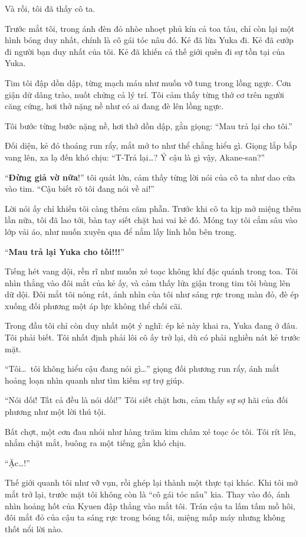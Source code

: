 \documentclass[../main.tex]{subfiles}
\begin{document}
Và rồi, tôi đã thấy cô ta.

Trước mắt tôi, trong ánh đèn đỏ nhòe nhoẹt phủ kín cả toa tàu, chỉ còn lại một hình bóng duy nhất, chính là cô gái tóc nâu đó. Kẻ đã lừa Yuka đi. Kẻ đã cướp đi người bạn duy nhất của tôi. Kẻ đã khiến cả thế giới quên đi sự tồn tại của Yuka.

Tim tôi đập dồn dập, từng mạch máu như muốn vỡ tung trong lồng ngực. Cơn giận dữ dâng trào, nuốt chửng cả lý trí. Tôi cảm thấy từng thớ cơ trên người căng cứng, hơi thở nặng nề như có ai đang đè lên lồng ngực.

Tôi bước từng bước nặng nề, hơi thở dồn dập, gằn giọng: ``Mau trả lại cho tôi.''

Đối diện, kẻ đó thoáng run rẩy, mắt mở to như thể chẳng hiểu gì. Giọng lắp bắp vang lên, xa lạ đến khó chịu: ``T-Trả lại\dots? Ý cậu là gì vậy, Akane-san?''

``\textbf{Đừng giả vờ nữa}!'' tôi quát lớn, cảm thấy từng lời nói của cô ta như dao cứa vào tim. ``Cậu biết rõ tôi đang nói về ai!''

Lời nói ấy chỉ khiến tôi càng thêm căm phẫn. Trước khi cô ta kịp mở miệng thêm lần nữa, tôi đã lao tới, bàn tay siết chặt hai vai kẻ đó. Móng tay tôi cắm sâu vào lớp vải áo, như muốn xuyên qua để nắm lấy linh hồn bên trong.

``\textbf{Mau trả lại Yuka cho tôi!!!}''


Tiếng hét vang dội, rền rĩ như muốn xé toạc không khí đặc quánh trong toa. Tôi nhìn thẳng vào đôi mắt của kẻ ấy, và cảm thấy lửa giận trong tim tôi bùng lên dữ dội. Đôi mắt tôi nóng rát, ánh nhìn của tôi như sáng rực trong màn đỏ, đè ép xuống đối phương một áp lực không thể chối cãi.

Trong đầu tôi chỉ còn duy nhất một ý nghĩ: ép kẻ này khai ra, Yuka đang ở đâu. Tôi phải biết. Tôi nhất định phải lôi cô ấy trở lại, dù có phải nghiền nát kẻ trước mặt.

``Tôi\dots\ tôi không hiểu cậu đang nói gì\dots'' giọng đối phương run rẩy, ánh mắt hoảng loạn nhìn quanh như tìm kiếm sự trợ giúp.

``Nói dối! Tất cả đều là nói dối!'' Tôi siết chặt hơn, cảm thấy sự sợ hãi của đối phương như một lời thú tội.

Bất chợt, một cơn đau nhói như hàng trăm kim châm xé toạc óc tôi. Tôi rít lên, nhắm chặt mắt, buông ra một tiếng gằn khó chịu.

``Ặc\dots!''

Thế giới quanh tôi như vỡ vụn, rồi ghép lại thành một thực tại khác. Khi tôi mở mắt trở lại, trước mặt tôi không còn là ``cô gái tóc nâu'' kia. Thay vào đó, ánh nhìn hoảng hốt của Kyuen đập thẳng vào mắt tôi. Trán cậu ta lấm tấm mồ hôi, đôi mắt đỏ của cậu ta sáng rực trong bóng tối, miệng mấp máy nhưng không thốt nổi lời nào.
\end{document}
